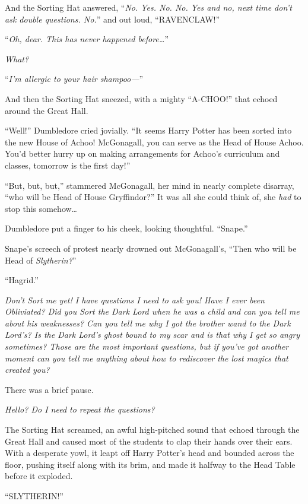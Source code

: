 And the Sorting Hat answered, “\emph{No. Yes. No. No. Yes and no, next time don’t ask double questions. No.}” and out loud, “RAVENCLAW!”

\later

“\emph{Oh, dear. This has never happened before…}”

\emph{What?}

“\emph{I’m allergic to your hair shampoo—}”

And then the Sorting Hat sneezed, with a mighty “A-CHOO!” that echoed around the Great Hall.

“Well!” Dumbledore cried jovially. “It seems Harry Potter has been sorted into the new House of Achoo! McGonagall, you can serve as the Head of House Achoo. You’d better hurry up on making arrangements for Achoo’s curriculum and classes, tomorrow is the first day!”

“But, but, but,” stammered McGonagall, her mind in nearly complete disarray, “who will be Head of House Gryffindor?” It was all she could think of, she \emph{had} to stop this somehow…

Dumbledore put a finger to his cheek, looking thoughtful. “Snape.”

Snape’s screech of protest nearly drowned out McGonagall’s, “Then who will be Head of \emph{Slytherin?}”

“Hagrid.”

\later

\emph{Don’t Sort me yet! I have questions I need to ask you! Have I ever been Obliviated? Did you Sort the Dark Lord when he was a child and can you tell me about his weaknesses? Can you tell me why I got the brother wand to the Dark Lord’s? Is the Dark Lord’s ghost bound to my scar and is that why I get so angry sometimes? Those are the most important questions, but if you’ve got another moment can you tell me anything about how to rediscover the lost magics that created you?}

There was a brief pause.

\emph{Hello? Do I need to repeat the questions?}

The Sorting Hat screamed, an awful high-pitched sound that echoed through the Great Hall and caused most of the students to clap their hands over their ears. With a desperate yowl, it leapt off Harry Potter’s head and bounded across the floor, pushing itself along with its brim, and made it halfway to the Head Table before it exploded.

\later

“SLYTHERIN!”

